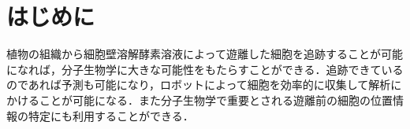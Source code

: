 \section{はじめに}

植物の組織から細胞壁溶解酵素溶液によって遊離した細胞を追跡することが可能になれば，分子生物学に大きな可能性をもたらすことができる．追跡できているのであれば予測も可能になり，ロボットによって細胞を効率的に収集して解析にかけることが可能になる．また分子生物学で重要とされる遊離前の細胞の位置情報の特定にも利用することができる．